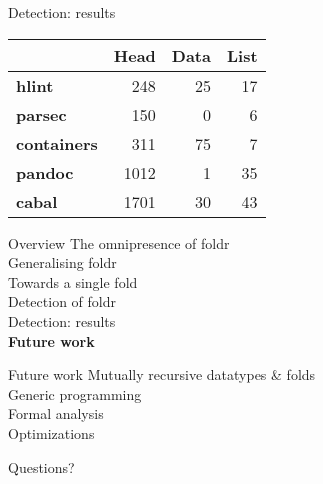\documentclass[20pt]{beamer}
\begin{document}
\begin{frame}[fragile]{Detection: results}
    \begin{tabular}{l|rrr}
                            & \textbf{Head} & \textbf{Data} & \textbf{List} \\
        \hline
        \textbf{hlint}      &           248 &            25 &            17 \\
        \textbf{parsec}     &           150 &             0 &             6 \\
        \textbf{containers} &           311 &            75 &             7 \\
        \textbf{pandoc}     &          1012 &             1 &            35 \\
        \textbf{cabal}      &          1701 &            30 &            43 \\
    \end{tabular}
\end{frame}


\begin{frame}{Overview}
    The omnipresence of foldr \\
    Generalising foldr \\
    Towards a single fold \\
    Detection of foldr \\
    Detection: results \\
    \textbf{Future work} \\
\end{frame}

\begin{frame}{Future work}
    Mutually recursive datatypes \& folds \\
    Generic programming \\
    Formal analysis \\
    Optimizations \\
\end{frame}


\begin{frame}{}
    \begin{center}
    \center\huge{Questions?}
    \end{center}
\end{frame}
\end{document}
